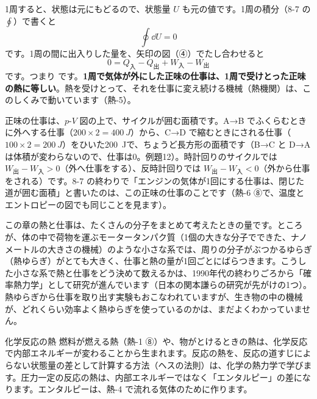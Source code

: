 \par\vspace{4pt}
1周すると、状態は元にもどるので、状態量 $U$ も元の値です。1周の積分（8-7 の $\oint$）で書くと
\[\oint\dd U=0\]
です。1周の間に出入りした量を、矢印の図（④）でたし合わせると
\[0=Q_{\text{入}}-Q_{\text{出}}+W_{\text{入}}-W_{\text{出}}\]
です。つまり
です。\textbf{1周で気体が外にした正味の仕事は、1周で受けとった正味の熱に等しい}。熱を受けとって、それを仕事に変え続ける機械（熱機関）は、このしくみで動いています（熱-5）。

正味の仕事は、$p$-$V$ 図の上で、サイクルが囲む面積です。A→B でふくらむときに外へする仕事（$200\times2=\qty{400}{J}$）から、C→D で縮むときにされる仕事（$100\times2=\qty{200}{J}$）をひいた\qty{200}{J}で、ちょうど長方形の面積です（B→C と D→A は体積が変わらないので、仕事は0。例題12）。時計回りのサイクルでは $W_{\text{出}}-W_{\text{入}}>0$（外へ仕事をする）、反時計回りでは $W_{\text{出}}-W_{\text{入}}<0$（外から仕事をされる）です。8-7 の終わりで「エンジンの気体が1回にする仕事は、閉じた道が囲む面積」と書いたのは、この正味の仕事のことです（熱-6 ⑧で、温度とエントロピーの図でも同じことを見ます）。

\begin{phmada}
この章の熱と仕事は、たくさんの分子をまとめて考えたときの量です。ところが、体の中で荷物を運ぶモータータンパク質（1個の大きな分子でできた、ナノメートルの大きさの機械）のような小さな系では、周りの分子がぶつかるゆらぎ（熱ゆらぎ）がとても大きく、仕事と熱の量が1回ごとにばらつきます。こうした小さな系で熱と仕事をどう決めて数えるかは、1990年代の終わりごろから「確率熱力学」として研究が進んでいます（日本の関本謙らの研究が先がけの1つ）。熱ゆらぎから仕事を取り出す実験もおこなわれていますが、生き物の中の機械が、どれくらい効率よく熱ゆらぎを使っているのかは、まだよくわかっていません。
\end{phmada}

\begin{phsaki}{化学反応の熱}
燃料が燃える熱（熱-1 ⑧）や、物がとけるときの熱は、化学反応で内部エネルギーが変わることから生まれます。反応の熱を、反応の道すじによらない状態量の差として計算する方法（ヘスの法則）は、化学の熱力学で学びます。圧力一定の反応の熱は、内部エネルギーではなく「エンタルピー」の差になります。エンタルピーは、熱-4 で流れる気体のために作ります。
\end{phsaki}

